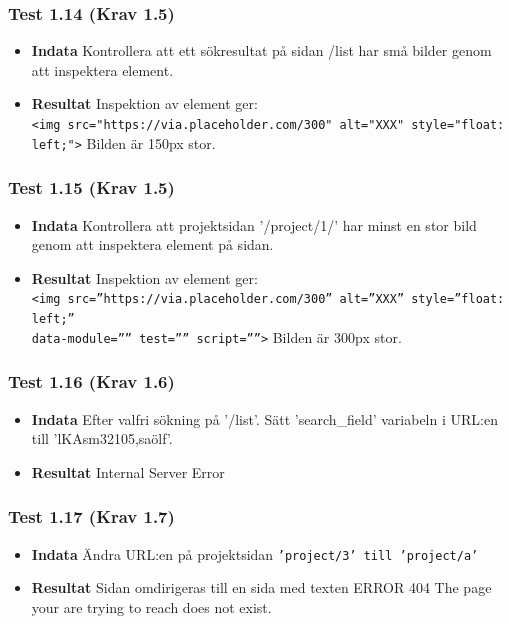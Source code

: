\documentclass{TDP003mall}
\begin{document}
\subsubsection*{Test 1.14 (Krav 1.5)}
\begin{itemize}
\item[]\textbf{Indata} Kontrollera att ett sökresultat på sidan /list har små bilder genom att inspektera element. 
\item[]\textbf{Resultat} Inspektion av element ger:\\ \texttt{<img src="https://via.placeholder.com/300" alt="XXX" style="float: left;">} Bilden är 150px stor.
\end{itemize}
\subsubsection*{Test 1.15 (Krav 1.5)}
\begin{itemize}
\item[]\textbf{Indata} Kontrollera att projektsidan '/project/1/' har minst en stor bild genom att inspektera element på sidan.
\item[]\textbf{Resultat} Inspektion av element ger:\\ \texttt{<img src=''https://via.placeholder.com/300'' alt=''XXX'' style=''float: left;''\\ data-module='''' test='''' script=''''>} Bilden är 300px stor.
\end{itemize}
\subsubsection*{Test 1.16 (Krav 1.6)}
\begin{itemize}
\item[]\textbf{Indata} Efter valfri sökning på '/list'. Sätt 'search\_field' variabeln i URL:en till 'lKAsm32105,saölf'.
\item[]\textbf{Resultat} Internal Server Error
\end{itemize}
\subsubsection*{Test 1.17 (Krav 1.7)}
\begin{itemize}
\item[]\textbf{Indata} Ändra URL:en på projektsidan \texttt{'project/3' till 'project/a'}
\item[]\textbf{Resultat} Sidan omdirigeras till en sida med texten ERROR 404 The page your are trying to reach does not exist.
\end{itemize}
\end{document}
